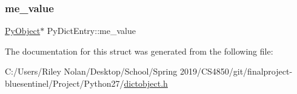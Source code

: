\mbox{\label{struct_py_dict_entry_a89a5e540de9a2d06cf3f25ae87f82009}} 
\subsubsection{\texorpdfstring{me\_value}{me\_value}}
{\footnotesize\ttfamily \mbox{\hyperlink{_python27_2object_8h_aadc84ac7aed2cfa6f20c25f62bf3dac7}{Py\+Object}}$\ast$ Py\+Dict\+Entry\+::me\+\_\+value}



The documentation for this struct was generated from the following file\+:\begin{DoxyCompactItemize}
\item 
C\+:/\+Users/\+Riley Nolan/\+Desktop/\+School/\+Spring 2019/\+C\+S4850/git/finalproject-\/bluesentinel/\+Project/\+Python27/\mbox{\hyperlink{dictobject_8h}{dictobject.\+h}}\end{DoxyCompactItemize}
